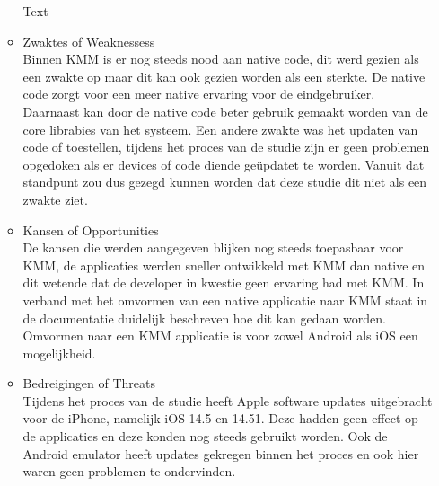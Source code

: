\begin{itemize}
\begin{itemize}
        Text
        \\
        \item Zwaktes of Weaknessess\\
        Binnen KMM is er nog steeds nood aan native code, dit werd gezien als een zwakte op maar dit kan ook gezien worden als een sterkte. De native code zorgt voor een meer native ervaring voor de eindgebruiker. Daarnaast kan door de native code beter gebruik gemaakt worden van de core librabies van het systeem. Een andere zwakte was het updaten van code of toestellen, tijdens het proces van de studie zijn er geen problemen opgedoken als er devices of code diende geüpdatet te worden. Vanuit dat standpunt zou dus gezegd kunnen worden dat deze studie dit niet als een zwakte ziet.
        \\
        \item Kansen of Opportunities\\
        De kansen die werden aangegeven blijken nog steeds toepasbaar voor KMM, de applicaties werden sneller ontwikkeld met KMM dan native en dit wetende dat de developer in kwestie geen ervaring had met KMM. In verband met het omvormen van een native applicatie naar KMM staat in de documentatie duidelijk beschreven hoe dit kan gedaan worden. Omvormen naar een KMM applicatie is voor zowel Android als iOS een mogelijkheid.
        \\
        \item Bedreigingen of Threats\\
        Tijdens het proces van de studie heeft Apple software updates uitgebracht voor de iPhone, namelijk iOS 14.5 en 14.51. Deze hadden geen effect op de applicaties en deze konden nog steeds gebruikt worden. Ook de Android emulator heeft updates gekregen binnen het proces en ook hier waren geen problemen te ondervinden.
    \end{itemize}
\end{itemize}

